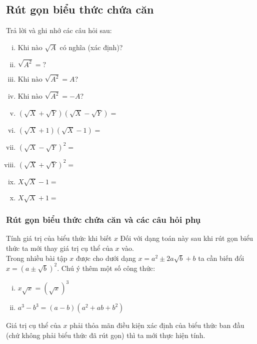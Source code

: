 \subsection{Rút gọn biểu thức chứa căn}
Trả lời và ghi nhớ các câu hỏi sau:
\begin{enumerate}[i)]
	\item Khi nào $\sqrt{A}$ có nghĩa (xác định)?\dotfill
	\item $ \sqrt{A^2}=?$\dotfill
	\item Khi nào $ \sqrt{A^2}=A$?\dotfill
	\item Khi nào $ \sqrt{A^2}=-A$?\dotfill
	\item $ (\sqrt{X}+\sqrt{Y})(\sqrt{X}-\sqrt{Y})=$\dotfill
	\item $ (\sqrt{X}+1)(\sqrt{X}-1)=$\dotfill
	\item $ (\sqrt{X}-\sqrt{Y})^2=$\dotfill
	\item $ (\sqrt{X}+\sqrt{Y})^2=$\dotfill
	\item $X\sqrt{X}-1=$\dotfill
	\item $X\sqrt{X}+1=$\dotfill
\end{enumerate}
\subsubsection{Rút gọn biểu thức chứa căn và các câu hỏi phụ}
\begin{dang}{Tính giá trị của biểu thức khi biết $x$}
	Đối với dạng toán này sau khi rút gọn biểu thức ta mới thay giá trị cụ thể của $x$ vào.\\
	Trong nhiều bài tập $x$ được cho dưới dạng $x=a^2\pm 2a\sqrt{b}+b$ ta cần biến đổi $x=(a\pm \sqrt{b})^2.$
	Chú ý thêm một số công thức:
	\begin{enumerate}[i)]
		\item $x\sqrt{x}=(\sqrt{x})^3$
		\item $a^3-b^3=(a-b)(a^2+ab+b^2)$
	\end{enumerate}
	\begin{note}
		Giá trị cụ thể của $x$ phải thỏa mãn điều kiện xác định của biểu thức ban đầu (chứ không phải biểu thức đã rút gọn) thì ta mới thực hiện tính.
	\end{note}
\end{dang}



